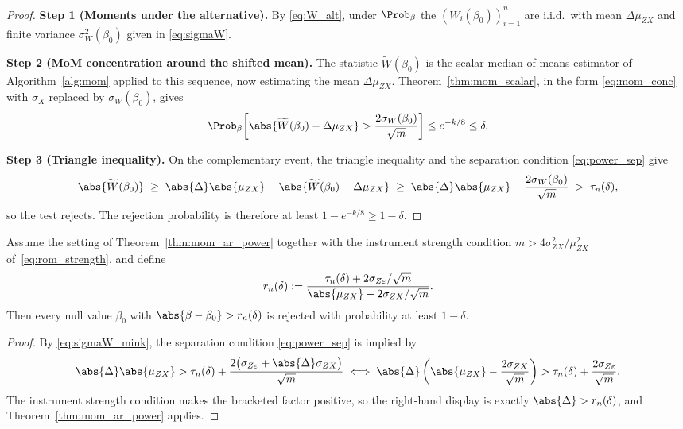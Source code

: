 \begin{proof}
\medskip\noindent\textbf{Step 1 (Moments under the alternative).}
By \eqref{eq:W_alt}, under $\Prob_\beta$ the $(W_i(\beta_0))_{i=1}^{n}$ are i.i.d.\ with mean $\Delta\mu_{ZX}$ and finite variance $\sigma_W^2(\beta_0)$ given in \eqref{eq:sigmaW}.

\medskip\noindent\textbf{Step 2 (MoM concentration around the shifted mean).}
The statistic $\widetilde{W}(\beta_0)$ is the scalar median-of-means estimator of Algorithm~\ref{alg:mom} applied to this sequence, now estimating the mean $\Delta\mu_{ZX}$. Theorem~\ref{thm:mom_scalar}, in the form \eqref{eq:mom_conc} with $\sigma_X$ replaced by $\sigma_W(\beta_0)$, gives
\[
  \Prob_\beta\!\left[\abs{\widetilde{W}(\beta_0) - \Delta\mu_{ZX}} > \frac{2\sigma_W(\beta_0)}{\sqrt{m}}\right] \le e^{-k/8} \le \delta.
\]

\medskip\noindent\textbf{Step 3 (Triangle inequality).}
On the complementary event, the triangle inequality and the separation condition \eqref{eq:power_sep} give
\[
  \abs{\widetilde{W}(\beta_0)}
  \;\ge\; \abs{\Delta}\abs{\mu_{ZX}} - \abs{\widetilde{W}(\beta_0) - \Delta\mu_{ZX}}
  \;\ge\; \abs{\Delta}\abs{\mu_{ZX}} - \frac{2\sigma_W(\beta_0)}{\sqrt{m}}
  \;>\; \tau_n(\delta),
\]
so the test rejects. The rejection probability is therefore at least $1 - e^{-k/8} \ge 1-\delta$.
\end{proof}

\begin{corollary}
\label{cor:detection_radius}
Assume the setting of Theorem~\ref{thm:mom_ar_power} together with the instrument strength condition $m > 4\sigma_{ZX}^2/\mu_{ZX}^2$ of~\eqref{eq:rom_strength}, and define
\begin{equation}
  r_n(\delta) := \frac{\tau_n(\delta) + 2\sigma_{Z\varepsilon}/\sqrt{m}}{\abs{\mu_{ZX}} - 2\sigma_{ZX}/\sqrt{m}}.
  \label{eq:radius}
\end{equation}
Then every null value $\beta_0$ with $\abs{\beta - \beta_0} > r_n(\delta)$ is rejected with probability at least $1-\delta$.
\end{corollary}

\begin{proof}
By \eqref{eq:sigmaW_mink}, the separation condition \eqref{eq:power_sep} is implied by
\[
  \abs{\Delta}\abs{\mu_{ZX}} > \tau_n(\delta) + \frac{2\bigl(\sigma_{Z\varepsilon} + \abs{\Delta}\sigma_{ZX}\bigr)}{\sqrt{m}}
  \iff
  \abs{\Delta}\left(\abs{\mu_{ZX}} - \frac{2\sigma_{ZX}}{\sqrt{m}}\right) > \tau_n(\delta) + \frac{2\sigma_{Z\varepsilon}}{\sqrt{m}}.
\]
The instrument strength condition makes the bracketed factor positive, so the right-hand display is exactly $\abs{\Delta} > r_n(\delta)$, and Theorem~\ref{thm:mom_ar_power} applies.
\end{proof}

